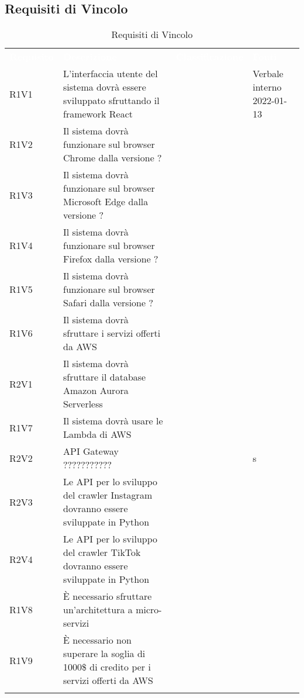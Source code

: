 \subsection{Requisiti di Vincolo}


\renewcommand{\arraystretch}{1.5}
\begin{longtable}{ m{}<{\centering}  m{}<{\centering}  m{}<{\centering}  m{}<{\centering}}
	\rowcolor{darkblue}
	\textcolor{white}{\textbf{Requisito}} &\textcolor{white}{\textbf{Descrizione}}& \textcolor{white}{\textbf{Classificazione}} & \textcolor{white}{\textbf{Fonti}}\\ 

	R1V1 & L’interfaccia utente del sistema dovrà essere sviluppato sfruttando il framework React & \Ob & Verbale interno 2022-01-13 \\	

	R1V2 & Il sistema dovrà funzionare sul browser Chrome dalla versione ? & \Ob & \Vi \\	
	 
	R1V3 & Il sistema dovrà funzionare sul browser Microsoft Edge dalla versione ? & \Ob & \Vi \\	

	R1V4 & Il sistema dovrà funzionare sul browser Firefox dalla versione ? & \Ob & \Vi \\	
	 
	R1V5 & Il sistema dovrà funzionare sul browser Safari dalla versione ? & \Ob & \Vi \\	
	 
	R1V6 & Il sistema dovrà sfruttare i servizi offerti da AWS & \Ob & \Ca \\	
	 
	R2V1 & Il sistema dovrà sfruttare il database Amazon Aurora Serverless & \De & \Vi \\
	
	R1V7 & Il sistema dovrà usare le Lambda di AWS & \Ob & \Ca \\	
	 
	R2V2 & API Gateway ??????????? & \De & s\\	 

	R2V3 & Le API per lo sviluppo del crawler Instagram dovranno essere sviluppate in Python & \De & \Vi \\	
	 
	R2V4 & Le API per lo sviluppo del crawler TikTok dovranno essere sviluppate in Python & \De & \Vi \\	
	 
	R1V8 & È necessario sfruttare un’architettura a micro-servizi & \Ob & \Ca \\	
	 
	R1V9 & È necessario non superare la soglia di 1000\$ di credito per i servizi offerti da AWS & \Ob & \Ve \\	
	
	\hiderowcolors \caption{Requisiti di Vincolo}
\end{longtable}

\pagebreak